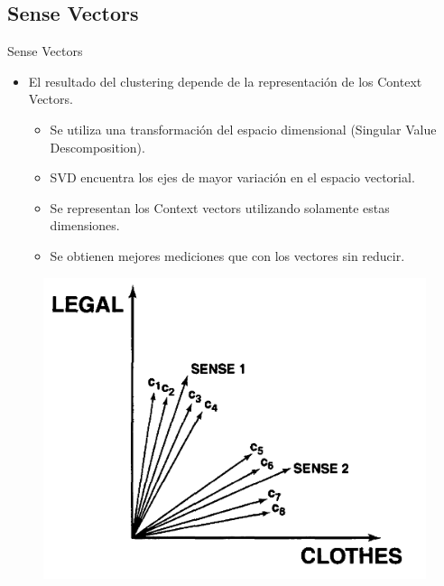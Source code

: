 \documentclass[xcolor=x11names,compress]{beamer}
\renewcommand{\(}{\begin{columns}}
\renewcommand{\)}{\end{columns}}
\newcommand{\<}[1]{\begin{column}{#1}}
\renewcommand{\>}{\end{column}}
\begin{document}
\subsection{Sense Vectors}
\begin{frame}{Sense Vectors}
\begin{itemize}
\item El resultado del clustering depende de la representación de los Context Vectors.
\begin{itemize}
\item Se utiliza una transformación del espacio dimensional (Singular Value Descomposition).
\item SVD encuentra los ejes de mayor variación en el espacio vectorial.
\item Se representan los Context vectors utilizando solamente estas dimensiones.
\item Se obtienen mejores mediciones que con los vectores sin reducir.
\end{itemize}
\end{itemize}
\begin{figure}
\centering
\includegraphics[scale=0.24, keepaspectratio=True, natwidth=800,natheight=600]{sense_vector.png}
\end{figure}
\end{frame}
\end{document}
